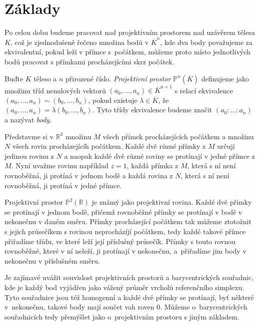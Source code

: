 \documentclass[12pt]{report}
\begin{document}
\section{Základy}


Po celou dobu budeme pracovat nad projektivním prostorem nad uzávěrem tělesa $K$, což je zjednodušeně řečeno množina bodů v $\overline{K}^n$, kde dva body považujeme za ekvivalentní, pokud leží v přímce s~počátkem, můžeme proto místo jednotlivých bodů pracovat s přímkami procházejícími skrz počátek.
\begin{definice}
Buďte $K$ těleso a $n$ přirozené číslo. \textit{Projektivní prostor} $\mathbb{P}^n (\overline{K})$ definujeme jako množinu tříd nenulových vektorů $(a_0, \dots, a_n) \in \overline{K}^{n+1}$ s relací ekvivalence $(a_0, \dots, a_n) \sim (b_0, \dots, b_n)$, pokud existuje $\lambda \in \overline{K}$, že $(a_0, \dots, a_n) = \lambda (b_0, \dots, b_n)$. Tyto třídy ekvivalence budeme značit $(a_0 : \dots : a_n)$ a nazývat \textit{body}.
\end{definice}

Představme si v $\mathbb{R}^3$ množinu $M$ všech přímek procházejících počátkem a množinu $N$ všech rovin procházejícíh počátkem.  Každé dvě různé přímky z $M$ určují jedinou rovinu z $N$ a naopak každé dvě různé roviny se protínají v jedné přímce z $M$. Nyní uvažme rovinu například $z=1$, každá přímka z $M$, která s ní není rovnoběžná, ji protíná v jednom bodě a každá rovina z $N$, která s ní není rovnoběžná, ji protíná v jedné přímce. 

Projektivní prostor $\mathbb{P}^2 (\mathbb{R})$ je známý jako projektivní rovina. Každé dvě přímky se protínají v jednom bodě, přičemž rovnoběžné přímky se protínají v bodě v nekonečnu v daném směru. Přímky procházející počátkem tak můžeme ztotožnit s jejich průsečíkem s rovinou neprocházíjí počátkem, tedy každé takové přímce přiřadíme třídu, ve které leží její příslušný průsečík. Přímky s touto rovnou rovnoběžné, které v ní neleží, ji protínají v nekonečnu, a~přiřadíme jim body v nekonečnu v příslušném směru.
\begin{poznamka}
Je zajímavé uvážit souvislost projektivních prostorů a barycentrických souřadnic, kde je každý bod vyjádřen jako vážený průměr vrcholů referenčního simplexu. Tyto souřadnice jsou též homogenní a každé dvě přímky se protínají, byť některé v~nekonečnu, takové body mají součet vah roven $0$. Můžeme o~barycentrických souřadnicích tedy přemýšlet jako o~projektivním prostoru s jiným základem.
\end{poznamka}
\end{document}
